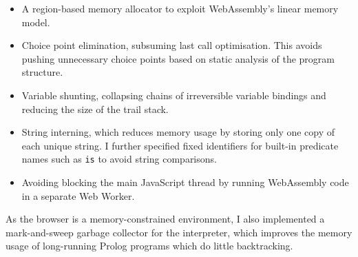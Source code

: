 \documentclass{article}
\begin{document}
\begin{itemize}
\item A region-based memory allocator to exploit WebAssembly's linear memory model.
\item Choice point elimination, subsuming last call optimisation. This avoids pushing unnecessary choice points based on static analysis of the program structure.
\item Variable shunting, collapsing chains of irreversible variable bindings and reducing the size of the trail stack.
\item String interning, which reduces memory usage by storing only one copy of each unique string. I further specified fixed identifiers for built-in predicate names such as \texttt{is} to avoid string comparisons.
\item Avoiding blocking the main JavaScript thread by running WebAssembly code in a separate Web Worker.
\end{itemize}

As the browser is a memory-constrained environment, I also implemented a mark-and-sweep garbage collector for the interpreter, which improves the memory usage of long-running Prolog programs which do little backtracking.
\end{document}
